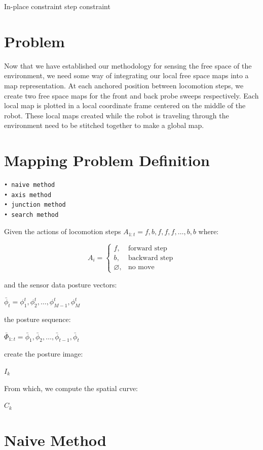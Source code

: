 In-place constraint
step constraint

\section{Problem}
\label{maps:problem}

Now that we have established our methodology for sensing the free space of the environment, we need some way of integrating our local free space maps into a map representation. At each anchored position between locomotion steps, we create two free space maps for the front and back probe sweeps respectively. Each local map is plotted in a local coordinate frame centered on the middle of the robot. These local maps created while the robot is traveling through the environment need to be stitched together to make a global map.

\section{Mapping Problem Definition}
\label{mappingproblemdefinition}

\begin{verbatim}
• naive method
• axis method
• junction method
• search method
\end{verbatim}


Given the actions of locomotion steps $A_{1:t} = {f, b, f, f, f, … , b, b}$ where:


\[
    A_i = 
\begin{cases}
    f, & \text{forward step}\\
    b, & \text{backward step}\\
    \varnothing, & \text{no move}
\end{cases}
\]


and the sensor data posture vectors:

$ \bar{\phi}_t = { \phi^t_1, \phi^t_2, … , \phi^t_{M-1}, \phi^t_M} $

the posture sequence:

$ \bar{\Phi}_{1:t} = { \bar{\phi}_1, \bar{\phi}_2, … , \bar{\phi}_{t-1}, \bar{\phi}_t} $

create the posture image:

$I_{k}$

From which, we compute the spatial curve: 

$ C_k $

\section{Naive Method}
\label{naivemethod}

